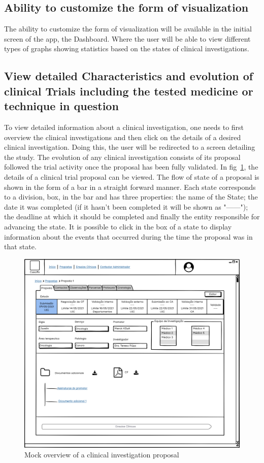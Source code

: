\subsection{Ability to customize the form of visualization}
\label{subsec:ability-to-customize-visualization}
The ability to customize the form of visualization will be available in the initial screen of the app, the Dashboard. Where the user will be able to view different types of graphs showing statistics based on the states of clinical investigations.

\subsection{View detailed Characteristics and evolution of clinical Trials including the tested medicine or technique in question}
\label{subsec:clinical-investigation-details}
To view detailed information about a clinical investigation, one needs to first overview the clinical investigations and then click on the details of a desired clinical investigation. Doing this, the user will be redirected to a screen detailing the study.  
The evolution of any clinical investigation consists of its proposal followed the trial activity once the proposal has been fully validated.
In fig~\ref{fig:proposta-detalhe}, the details of a clinical trial proposal can be viewed. The flow of state of a proposal is shown in the form of a bar in a straight forward manner. Each state corresponds to a division, box, in the bar and has three properties: the name of the State; the date it was completed (if it hasn't been completed it will be shown as "------"); the deadline at which it should be completed and finally the entity responsible for advancing the state.  
It is possible to click in the box of a state to display information about the events that occurred during the time the proposal was in that state. 

\begin{figure}[H]
    \centering
    \includegraphics[scale=0.35]{images/proposta-detalhe.png}
    \caption{Mock overview of a clinical investigation proposal}
    \label{fig:proposta-detalhe}
\end{figure}

